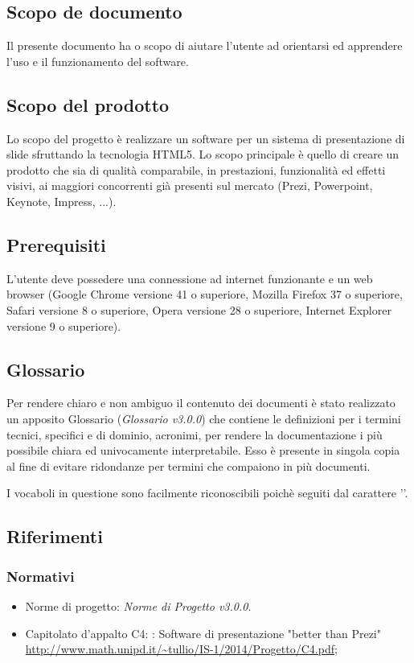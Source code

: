\subsection{Scopo de documento}
Il presente documento ha o scopo di aiutare l'utente ad orientarsi ed apprendere l'uso e il funzionamento del software.

\subsection{Scopo del prodotto}
Lo scopo del progetto è realizzare un software per un sistema di presentazione di \gls{slide} sfruttando la tecnologia \gls{HTML5}. Lo scopo principale è quello di creare un prodotto che sia di qualità comparabile, in prestazioni, funzionalità ed effetti visivi, ai maggiori concorrenti già presenti sul mercato (Prezi, Powerpoint, Keynote, Impress, ...).

\subsection{Prerequisiti}
L'utente deve possedere una connessione ad internet funzionante e un web browser (Google Chrome versione 41 o superiore, Mozilla Firefox 37 o superiore, Safari versione 8 o superiore, Opera versione 28 o superiore, Internet Explorer versione 9 o superiore).

\subsection{Glossario}
Per rendere chiaro e non ambiguo il contenuto dei documenti è stato realizzato un apposito Glossario (\textit{Glossario v3.0.0}) che contiene le definizioni per i termini tecnici, specifici e di dominio, acronimi, per rendere la documentazione i più possibile chiara ed univocamente interpretabile. Esso è presente in singola copia al fine di evitare ridondanze per termini che compaiono in più documenti.

I vocaboli in questione sono facilmente riconoscibili poichè seguiti dal carattere ''.

\subsection{Riferimenti}
\subsubsection{Normativi}

\begin{itemize}
	\item Norme di progetto: \textit{Norme di Progetto v3.0.0}.
	\item Capitolato d'appalto C4: \PROGETTO: Software di presentazione "better than Prezi" \\ \url{http://www.math.unipd.it/~tullio/IS-1/2014/Progetto/C4.pdf};
\end{itemize}

